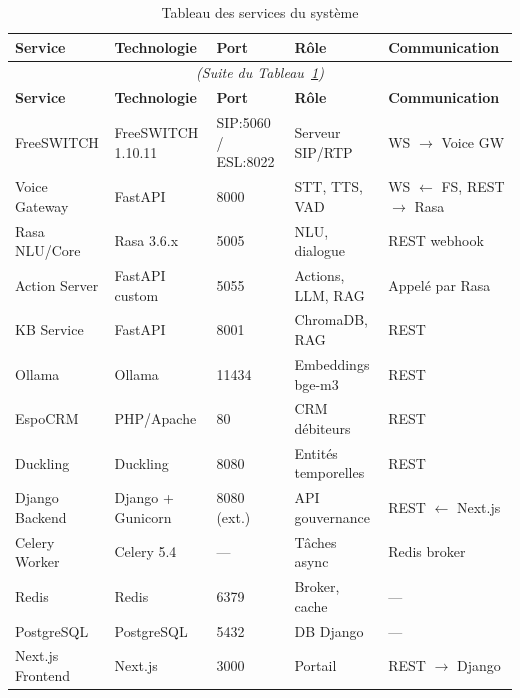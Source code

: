 \begin{longtable}{lllll}
  \caption{Tableau des services du système} \label{tab:services} \\
  \toprule
  \textbf{Service} & \textbf{Technologie} & \textbf{Port} & \textbf{Rôle} & \textbf{Communication} \\
  \midrule
  \endfirsthead
  \multicolumn{5}{c}{\textit{(Suite du Tableau~\ref{tab:services})}} \\
  \toprule
  \textbf{Service} & \textbf{Technologie} & \textbf{Port} & \textbf{Rôle} & \textbf{Communication} \\
  \midrule
  \endhead
  \bottomrule
  \endfoot
  FreeSWITCH   & FreeSWITCH 1.10.11 & SIP:5060 / ESL:8022 & Serveur SIP/RTP   & WS $\rightarrow$ Voice GW \\
  Voice Gateway & FastAPI            & 8000                & STT, TTS, VAD     & WS $\leftarrow$ FS, REST $\rightarrow$ Rasa \\
  Rasa NLU/Core & Rasa 3.6.x        & 5005                & NLU, dialogue     & REST webhook \\
  Action Server & FastAPI custom     & 5055                & Actions, LLM, RAG & Appelé par Rasa \\
  KB Service   & FastAPI            & 8001                & ChromaDB, RAG     & REST \\
  Ollama       & Ollama             & 11434               & Embeddings bge-m3 & REST \\
  EspoCRM      & PHP/Apache         & 80                  & CRM débiteurs     & REST \\
  Duckling     & Duckling           & 8080                & Entités temporelles & REST \\
  Django Backend & Django + Gunicorn & 8080 (ext.)        & API gouvernance   & REST $\leftarrow$ Next.js \\
  Celery Worker & Celery 5.4        & —                   & Tâches async      & Redis broker \\
  Redis        & Redis              & 6379                & Broker, cache     & — \\
  PostgreSQL   & PostgreSQL         & 5432                & DB Django         & — \\
  Next.js Frontend & Next.js        & 3000                & Portail           & REST $\rightarrow$ Django \\
\end{longtable}


